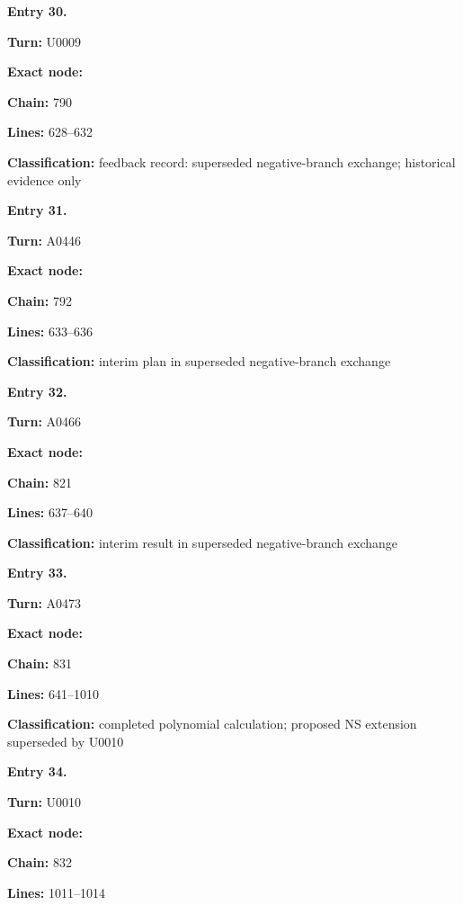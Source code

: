 \textbf{Entry 30.}

\textbf{Turn:} U0009

\textbf{Exact node:} \protect{}

\textbf{Chain:} 790

\textbf{Lines:} 628--632

\textbf{Classification:} feedback record: superseded negative-branch
exchange; historical evidence only


\textbf{Entry 31.}

\textbf{Turn:} A0446

\textbf{Exact node:} \protect{}

\textbf{Chain:} 792

\textbf{Lines:} 633--636

\textbf{Classification:} interim plan in superseded negative-branch
exchange


\textbf{Entry 32.}

\textbf{Turn:} A0466

\textbf{Exact node:} \protect{}

\textbf{Chain:} 821

\textbf{Lines:} 637--640

\textbf{Classification:} interim result in superseded negative-branch
exchange


\textbf{Entry 33.}

\textbf{Turn:} A0473

\textbf{Exact node:} \protect{}

\textbf{Chain:} 831

\textbf{Lines:} 641--1010

\textbf{Classification:} completed polynomial calculation; proposed NS
extension superseded by U0010


\textbf{Entry 34.}

\textbf{Turn:} U0010

\textbf{Exact node:} \protect{}

\textbf{Chain:} 832

\textbf{Lines:} 1011--1014

